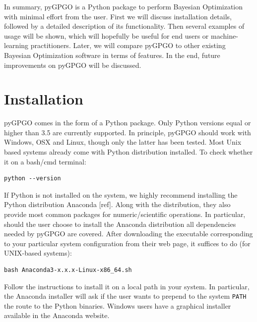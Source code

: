 \documentclass[10pt,a4paper,twoside]{book}
\begin{document}
In summary, pyGPGO is a Python package to perform Bayesian Optimization with minimal effort from the user. First we will discuss installation details, followed by a detailed description of its functionality. Then several examples of usage will be shown, which will hopefully be useful for end users or machine-learning practitioners. Later, we will compare pyGPGO to other existing Bayesian Optimization software in terms of features. In the end, future improvements on pyGPGO will be discussed.

\section{Installation}

pyGPGO comes in the form of a Python package. Only Python versions equal or higher than 3.5 are currently supported. In principle, pyGPGO should work with Windows, OSX and Linux, though only the latter has been tested. Most Unix based systems already come with Python distribution installed. To check whether it on a bash/cmd terminal:

\begin{verbatim}
python --version   
\end{verbatim}

If Python is not installed on the system, we highly recommend installing the Python distribution Anaconda [ref]. Along with the distribution, they also provide most common packages for numeric/scientific operations. In particular, should the user choose to install the Anaconda distribution all dependencies needed by pyGPGO are covered. After downloading the executable corresponding to your particular system configuration from their web page, it suffices to do (for UNIX-based systems):

\begin{verbatim}
bash Anaconda3-x.x.x-Linux-x86_64.sh
\end{verbatim}

Follow the instructions to install it on a local path in your system. In particular, the Anaconda installer will ask if the user wants to prepend to the system \texttt{PATH} the route to the Python binaries. Windows users have a graphical installer available in the Anaconda website.\\
\end{document}
